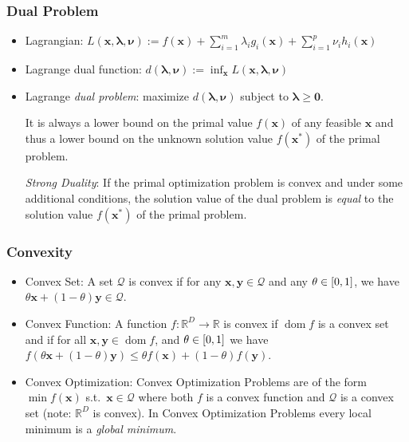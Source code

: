 \documentclass[11pt,a4paper,technote]{IEEEtran}
\newcommand{\vect}[1]{\boldsymbol{\mathbf{#1}}}
\newcommand{\set}[1]{\mathcal{#1}}
\DeclareMathOperator{\dom}{dom}
\newcommand{\from}{\colon}
\newcommand{\R}{\mathbb{R}}
\begin{document}
\subsubsection*{Dual Problem}
\begin{itemize}
  \item Lagrangian: $L(\vect{x},\vect{\lambda},\vect{\nu}) := f(\vect{x}) +
    \sum_{i=1}^m \lambda_i g_i(\vect{x}) + \sum_{i=1}^p \nu_i h_i(\vect{x})$
  \item Lagrange dual function: $d(\vect{\lambda},\vect{\nu}) := \inf_{\vect{x}}
    L(\vect{x},\vect{\lambda},\vect{\nu})$
  \item Lagrange \emph{dual problem}: maximize $d(\vect{\lambda},\vect{\nu})$
    subject to $\vect{\lambda} \geq \vect{0}$.

    It is always a lower bound on the primal value $f(\vect{x})$ of any
    feasible $\vect{x}$ and thus a lower bound on the unknown solution
    value $f(\vect{x}^*)$ of the primal problem.

    \emph{Strong Duality}: If the primal optimization problem is convex
    and under some additional conditions, the solution value of the dual
    problem is \emph{equal} to the solution value $f(\vect{x}^*)$ of the
    primal problem.
\end{itemize}

\subsubsection*{Convexity}
\begin{itemize}
  \item Convex Set: A set $\set{Q}$ is convex if for any $\vect{x},\vect{y} \in
    \set{Q}$ and any $\theta\in\interval{0}{1}$, we have $\theta\vect{x} +
    (1-\theta) \vect{y} \in \set{Q}$.
  \item Convex Function: A function $f\from\R^D\to\R$ is convex if $\dom f$ is
    a convex set and if for all $\vect{x},\vect{y}\in\dom f$, and $\theta\in
    \interval{0}{1}$ we have $f(\theta\vect{x} + (1-\theta)\vect{y}) \leq \theta
    f(\vect{x}) + (1-\theta)f(\vect{y})$.
  \item Convex Optimization: Convex Optimization Problems are of the form $\min
    f(\vect{x})$ s.t.\ $\vect{x}\in \set{Q}$ where both $f$ is a convex
    function and $\set{Q}$ is a convex set (note: $\R^D$ is convex). In Convex
    Optimization Problems every local minimum is a \emph{global minimum}.
\end{itemize}
\end{document}
